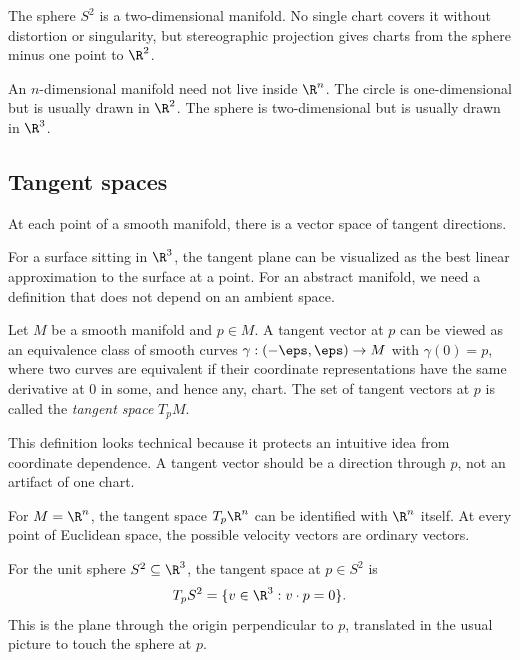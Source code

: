 \begin{example}
The sphere $S^2$ is a two-dimensional manifold. No single chart covers it
without distortion or singularity, but stereographic projection gives charts
from the sphere minus one point to $\R^2$.
\end{example}

\begin{trapbox}
An $n$-dimensional manifold need not live inside $\R^n$. The circle is
one-dimensional but is usually drawn in $\R^2$. The sphere is two-dimensional
but is usually drawn in $\R^3$.
\end{trapbox}

\subsection{Tangent spaces}

At each point of a smooth manifold, there is a vector space of tangent
directions.

For a surface sitting in $\R^3$, the tangent plane can be visualized as the best
linear approximation to the surface at a point. For an abstract manifold, we
need a definition that does not depend on an ambient space.

\begin{definition}
Let $M$ be a smooth manifold and $p\in M$. A tangent vector at $p$ can be viewed
as an equivalence class of smooth curves $\gamma:(-\eps,\eps)\to M$ with
$\gamma(0)=p$, where two curves are equivalent if their coordinate
representations have the same derivative at $0$ in some, and hence any, chart.
The set of tangent vectors at $p$ is called the \emph{tangent space} $T_pM$.
\end{definition}

This definition looks technical because it protects an intuitive idea from
coordinate dependence. A tangent vector should be a direction through $p$, not
an artifact of one chart.

\begin{example}
For $M=\R^n$, the tangent space $T_p\R^n$ can be identified with $\R^n$ itself.
At every point of Euclidean space, the possible velocity vectors are ordinary
vectors.
\end{example}

\begin{example}
For the unit sphere $S^2\subseteq\R^3$, the tangent space at $p\in S^2$ is
\[
T_pS^2=\{v\in\R^3:v\cdot p=0\}.
\]
This is the plane through the origin perpendicular to $p$, translated in the
usual picture to touch the sphere at $p$.
\end{example}

